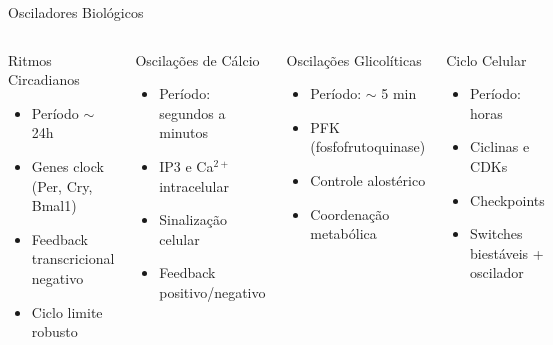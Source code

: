 \begin{frame}[allowframebreaks]{Osciladores Biológicos}
\begin{columns}
\begin{block}{Ritmos Circadianos}
\begin{itemize}
    \item Período $\sim$ 24h
    \item Genes clock (Per, Cry, Bmal1)
    \item Feedback transcricional negativo
    \item Ciclo limite robusto
\end{itemize}
\end{block}

\begin{block}{Oscilações de Cálcio}
\begin{itemize}
    \item Período: segundos a minutos
    \item IP3 e Ca$^{2+}$ intracelular
    \item Sinalização celular
    \item Feedback positivo/negativo
\end{itemize}
\end{block}

\begin{block}{Oscilações Glicolíticas}
\begin{itemize}
    \item Período: $\sim$ 5 min
    \item PFK (fosfofrutoquinase)
    \item Controle alostérico
    \item Coordenação metabólica
\end{itemize}
\end{block}

\begin{block}{Ciclo Celular}
\begin{itemize}
    \item Período: horas
    \item Ciclinas e CDKs
    \item Checkpoints
    \item Switches biestáveis + oscilador
\end{itemize}
\end{block}
\end{columns}

\vspace{0.3cm}

\end{frame}

